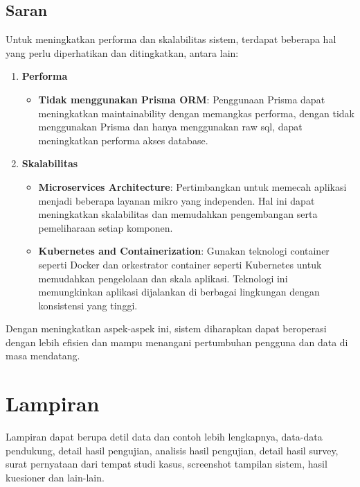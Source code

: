 \subsection{Saran}
Untuk meningkatkan performa dan skalabilitas sistem, terdapat beberapa hal yang perlu diperhatikan dan ditingkatkan, antara lain:
\begin{enumerate}
  \item \textbf{Performa} \newline
  \begin{itemize}
    \item \textbf{Tidak menggunakan Prisma ORM}: Penggunaan Prisma dapat meningkatkan maintainability dengan memangkas performa, dengan tidak menggunakan Prisma dan hanya menggunakan raw sql, dapat meningkatkan performa akses database.
  \end{itemize}
  \item \textbf{Skalabilitas} \newline
  \begin{itemize}
    \item \textbf{Microservices Architecture}: Pertimbangkan untuk memecah aplikasi menjadi beberapa layanan mikro yang independen. Hal ini dapat meningkatkan skalabilitas dan memudahkan pengembangan serta pemeliharaan setiap komponen.
    \item \textbf{Kubernetes and Containerization}: Gunakan teknologi container seperti Docker dan orkestrator container seperti Kubernetes untuk memudahkan pengelolaan dan skala aplikasi. Teknologi ini memungkinkan aplikasi dijalankan di berbagai lingkungan dengan konsistensi yang tinggi.
  \end{itemize}
\end{enumerate}
Dengan meningkatkan aspek-aspek ini, sistem diharapkan dapat beroperasi dengan lebih efisien dan mampu menangani pertumbuhan pengguna dan data di masa mendatang.

\newpage




\section*{Lampiran}

\noindent Lampiran dapat berupa detil data dan contoh lebih lengkapnya, data-data pendukung, detail hasil pengujian, analisis hasil pengujian, detail hasil survey, surat pernyataan dari tempat studi kasus, screenshot tampilan sistem, hasil kuesioner dan lain-lain.
